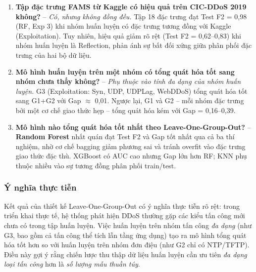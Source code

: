 \begin{enumerate}
    \item \textbf{Tập đặc trưng FAMS từ Kaggle có hiệu quả trên CIC-DDoS 2019 không?} -- \textit{Có, nhưng không đồng đều.} Tập 18 đặc trưng đạt Test F2 = 0,98 (RF, Exp 3) khi nhóm huấn luyện có đặc trưng tương đồng với Kaggle (Exploitation). Tuy nhiên, hiệu quả giảm rõ rệt (Test F2 = 0,62--0,83) khi nhóm huấn luyện là Reflection, phản ánh sự bất đối xứng giữa phân phối đặc trưng của hai bộ dữ liệu.

    \item \textbf{Mô hình huấn luyện trên một nhóm có tổng quát hóa tốt sang nhóm chưa thấy không?} -- \textit{Phụ thuộc vào tính đa dạng của nhóm huấn luyện.} G3 (Exploitation: Syn, UDP, UDPLag, WebDDoS) tổng quát hóa tốt sang G1+G2 với Gap $\approx$ 0,01. Ngược lại, G1 và G2 -- mỗi nhóm đặc trưng bởi một cơ chế giao thức hẹp -- tổng quát hóa kém với Gap = 0,16--0,39.

    \item \textbf{Mô hình nào tổng quát hóa tốt nhất theo Leave-One-Group-Out?} -- \textbf{Random Forest} nhất quán đạt Test F2 và Gap tốt nhất qua cả ba thí nghiệm, nhờ cơ chế bagging giảm phương sai và tránh overfit vào đặc trưng giao thức đặc thù. XGBoost có AUC cao nhưng Gap lớn hơn RF; KNN phụ thuộc nhiều vào sự tương đồng phân phối train/test.
\end{enumerate}

\subsubsection{Ý nghĩa thực tiễn}

Kết quả của thiết kế Leave-One-Group-Out có ý nghĩa thực tiễn rõ rệt: trong triển khai thực tế, hệ thống phát hiện DDoS thường gặp các kiểu tấn công mới chưa có trong tập huấn luyện. Việc huấn luyện trên nhóm tấn công \textit{đa dạng} (như G3, bao gồm cả tấn công thể tích lẫn tầng ứng dụng) tạo ra mô hình tổng quát hóa tốt hơn so với huấn luyện trên nhóm đơn điệu (như G2 chỉ có NTP/TFTP). Điều này gợi ý rằng chiến lược thu thập dữ liệu huấn luyện cần ưu tiên \textit{đa dạng loại tấn công} hơn là \textit{số lượng mẫu thuần túy}.

